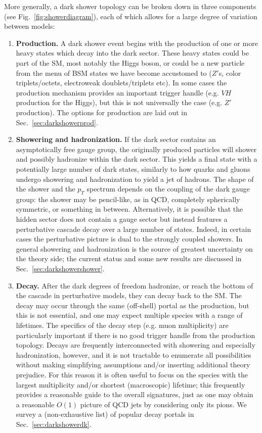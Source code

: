 More generally, a dark shower topology can be broken down in three components (see Fig.~\ref{fig:showerdiagram}), each of which allows for a large degree of variation between models:
\begin{enumerate}
\item \textbf{Production.} A dark shower event begins with the production of one or more heavy states which decay into the dark sector. These heavy states could be part of the SM, most notably the Higgs boson, or could be a new particle from the menu of BSM states we have become accustomed to ($Z'$s, color triplets/octets, electroweak doublets/triplets etc). In some cases the production mechanism provides an important trigger handle (e.g. $VH$  production for the Higgs), but this is not universally the case (e.g. $Z'$ production). The options for production are laid out in Sec.~\ref{sec:darkshowerprod}.

\item \textbf{Showering and hadronization.} If the dark sector contains an asymptotically free gauge group, the originally produced particles will shower and possibly hadronize within the dark sector. This yields a final state with a potentially large number of dark states, similarly to how quarks and gluons undergo showering and hadronization to yield a jet of hadrons. The shape of the shower and the $p_T$ spectrum depends on the coupling of the dark gauge group: the shower may be pencil-like, as in QCD, completely spherically symmetric, or something in between. Alternatively, it is possible that the hidden sector does not contain a gauge sector but instead features a perturbative cascade decay over a large number of states. Indeed, in certain cases the perturbative picture is dual to the strongly coupled showers.
In general showering and hadronization  is the  source of greatest uncertainty on the theory side; the current status and some new results are discussed in Sec.~\ref{sec:darkshowershower}. 
   
\item \textbf{Decay.} After the dark degrees of freedom hadronize, or reach the bottom of the cascade in perturbative models, they can decay back to the SM. The decay may occur through the same (off-shell) portal as the production, but this is not essential, and one may expect multiple species with a range of lifetimes. The specifics of the decay step (e.g. muon multiplicity) are particularly important if there is no good trigger handle from the production topology. Decays are frequently interconnected with  showering and especially hadronization, however, and it is not tractable to enumerate all possibilities without making simplifying assumptions and/or inserting additional theory prejudice. For this reason it is often useful to focus on the species with the largest multiplicity and/or shortest (macroscopic) lifetime; this frequently provides a reasonable guide to the overall signatures, just as one may obtain a reasonable $O(1)$ picture of QCD jets by considering only its pions.  We survey a (non-exhaustive list) of popular decay portals in Sec.~\ref{sec:darkshowerdk}.
 

\end{enumerate}
